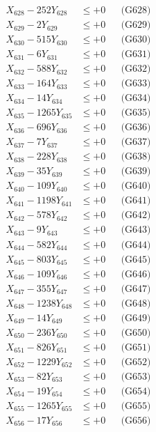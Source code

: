 \documentclass[a4paper,10pt]{article}
\begin{document}
{\begin{align}
X_{628} - 252Y_{628} &\leq +0 && \text{(G628)} \\
X_{629} - 2Y_{629} &\leq +0 && \text{(G629)} \\
X_{630} - 515Y_{630} &\leq +0 && \text{(G630)} \\
\allowbreak
X_{631} - 6Y_{631} &\leq +0 && \text{(G631)} \\
X_{632} - 588Y_{632} &\leq +0 && \text{(G632)} \\
X_{633} - 164Y_{633} &\leq +0 && \text{(G633)} \\
X_{634} - 14Y_{634} &\leq +0 && \text{(G634)} \\
X_{635} - 1265Y_{635} &\leq +0 && \text{(G635)} \\
X_{636} - 696Y_{636} &\leq +0 && \text{(G636)} \\
X_{637} - 7Y_{637} &\leq +0 && \text{(G637)} \\
X_{638} - 228Y_{638} &\leq +0 && \text{(G638)} \\
X_{639} - 35Y_{639} &\leq +0 && \text{(G639)} \\
X_{640} - 109Y_{640} &\leq +0 && \text{(G640)} \\
\allowbreak
X_{641} - 1198Y_{641} &\leq +0 && \text{(G641)} \\
X_{642} - 578Y_{642} &\leq +0 && \text{(G642)} \\
X_{643} - 9Y_{643} &\leq +0 && \text{(G643)} \\
X_{644} - 582Y_{644} &\leq +0 && \text{(G644)} \\
X_{645} - 803Y_{645} &\leq +0 && \text{(G645)} \\
X_{646} - 109Y_{646} &\leq +0 && \text{(G646)} \\
X_{647} - 355Y_{647} &\leq +0 && \text{(G647)} \\
X_{648} - 1238Y_{648} &\leq +0 && \text{(G648)} \\
X_{649} - 14Y_{649} &\leq +0 && \text{(G649)} \\
X_{650} - 236Y_{650} &\leq +0 && \text{(G650)} \\
\allowbreak
X_{651} - 826Y_{651} &\leq +0 && \text{(G651)} \\
X_{652} - 1229Y_{652} &\leq +0 && \text{(G652)} \\
X_{653} - 82Y_{653} &\leq +0 && \text{(G653)} \\
X_{654} - 19Y_{654} &\leq +0 && \text{(G654)} \\
X_{655} - 1265Y_{655} &\leq +0 && \text{(G655)} \\
X_{656} - 17Y_{656} &\leq +0 && \text{(G656)} \\

\end{align}}
\end{document}
